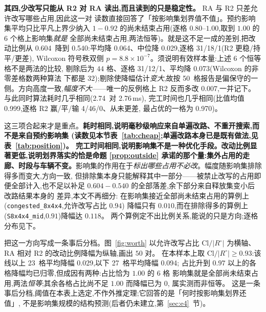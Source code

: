 \documentclass[manuscript,screen,review]{acmart}
\newcommand{\NPairs}{50}
\newcommand{\ClosureAliveFrac}{92\%}
\newcommand{\MsAllFuture}{2.76}      %
\newcommand{\MsCheapRtwo}{2.74}      %
\newcommand{\WinVsAllFuture}{4/46/0}
\newcommand{\ResFracCheapRtwo}{0.540}
\newcommand{\ResFracAllFuture}{0.604}
\newcommand{\RAStabWTL}{31/18/1}     %
\newcommand{\RAStabP}{8.8\times10^{-7}}  %
\newcommand{\RAStabMean}{0.064}      %
\newcommand{\RAStabWTLNet}{31/12/1} %
\newcommand{\RAStabMeanNet}{0.073}  %
\newcommand{\RAStabMed}{0.029}       %
\newcommand{\RACmaxRatio}{0.999}     %
\newcommand{\RACmaxLo}{0.970}        %
\newcommand{\ClosureShareLo}{0.80}   %
\newcommand{\ClosureShareMean}{0.92} %
\newcommand{\ScaleCloAliveHi}{0.91}  %
\newcommand{\WorthThresh}{0.93}
\newcommand{\WorthLowN}{27}
\newcommand{\WorthLowMean}{0.094}
\newcommand{\WorthHighN}{23}
\newcommand{\WorthHighMean}{0.029}
\newcommand{\WorthVanish}{0.97}
\begin{document}
\textbf{其四,少改写只能从 R2 对 RA 读出,而且读到的只是稳定性。} RA 与 R2 只差允许改写哪些占用,因此这一对
读数直接回答了「按影响集划界值不值」。预约影响集平均只比平凡上界少纳入 \(1-\ClosureShareMean\)
的尚未结束占用(逐格 \ClosureShareLo--\(1.00\),取到 \(1.00\) 的 \(6\) 个格上影响集\emph{就是}
全部尚未结束占用,两法恒等)。就是这不足一成的差别,把改动比例从 \ResFracAllFuture\ 降到
\ResFracCheapRtwo:平均降 \RAStabMean、中位降 \RAStabMed,逐格 \RAStabWTL(R2 更稳/持平/更差),
Wilcoxon 符号秩双侧 \(p=\RAStabP\)。须说明有效样本量:上述 \(6\) 个恒等格不是两法的比较,
剔除后为 \(44\) 格、逐格 \RAStabWTLNet、平均降 \RAStabMeanNet(Wilcoxon 的非零差格数两种算法
下都是 \(32\));剔除使降幅估计\emph{变大},故按 \NPairs\ 格报告是偏保守的一侧。方向高度一致,\emph{幅度不大}——唯一的反例格上 R2 反而多改 \(0.007\),一并记下。与此同时算法耗时几乎相同(\MsCheapRtwo\ 对 \MsAllFuture\,ms),
完工时间也几乎相同(比值均值 \RACmaxRatio,逐格 R2 赢/平/输 \WinVsAllFuture、从未更差,
最占优的一格为 \RACmaxLo)。

这三项合起来才是重点。\textbf{耗时相同,说明毫秒级响应来自单遍改路、不重开搜索,而不是来自预约影响集
(读数见本节表~\ref{tab:cheap};单遍改路本身已是既有做法,见表~\ref{tab:position})。
完工时间相同,说明影响集不是一种优化手段。改动比例显著更低,说明划界落实的恰是命题
\ref{prop:outside} 承诺的那个量:集外占用的走廊、时段与车辆不变。}影响集的作用在于\emph{标出哪些占用不必改}。幅度随影响集排除得多而变大,方向一致,
但排除集本身只能解释其中一部分——被禁止改写的占用即便全部计入,也不足以补足
\(\ResFracAllFuture-\ResFracCheapRtwo\) 的全部落差,余下部分来自释放集变小后改路结果本身的
差异,本文不再细分:
在影响集接近全部尚未结束占用的算例上(\texttt{congested\_8x4x4},允许改写占比 \(0.94\))
降幅只有 \(0.010\),而在排除得多的算例上(\texttt{S8x4x4\_mid},\(0.91\))降幅达 \(0.118\)。%
两个算例定不出比例关系,能说的只是方向;逐格分布见下。

把这一方向写成一条事后分档。图~\ref{fig:worth} 以允许改写占比
\(\mathrm{Cl}/|R^{\circ}|\) 为横轴、RA 相对 R2 的改动比例降幅为纵轴,画出 \(\NPairs\) 对。
在本样本上取 \(\mathrm{Cl}/|R^{\circ}|\ge\WorthThresh\):该线以上 \WorthHighN\ 格平均降幅
\WorthHighMean,以下 \WorthLowN\ 格平均降幅 \WorthLowMean;
占比升到 \(\WorthVanish\) 以上的各格降幅均已归零,但成因有两种:占比恰为 \(1.00\) 的 \(6\) 格
影响集就是全部尚未结束占用,两法\emph{恒等};其余各格占比尚不足 \(1.00\) 而降幅已为 \(0\),
属实测而非恒等。
这是一条事后分档,阈值在本表上选定,不作外推定理;它回答的是「何时按影响集划界还值」,
不是影响集规模的结构预测(后者仍未建立,第~\ref{sec:e4}~节)。
\end{document}
